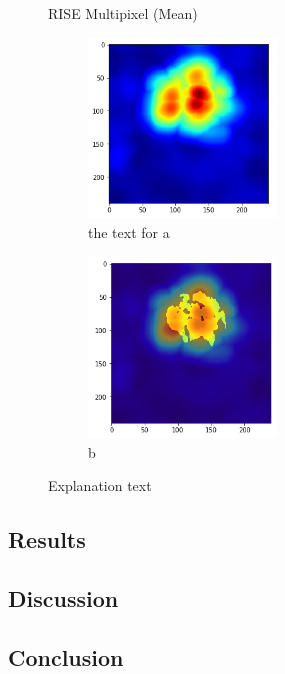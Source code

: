\begin{figure}[H]
    \centering
    \caption{RISE Multipixel (Mean)}
    \begin{subfigure}{.5\textwidth}
        \centering
        \includegraphics[width=5cm]{chapters/04_segmentation/images/rise_multipixel_max_1-0.png}
        \caption{ the text for a}
    \end{subfigure}%
    \begin{subfigure}{.5\textwidth}
        \centering
        \includegraphics[width=5cm]{chapters/04_segmentation/images/rise_multipixel_max_1-1.png}
        \caption{b}
    \end{subfigure}
    \caption{Explanation text}
\end{figure}

\subsection{Results}

\subsection{Discussion}

\subsection{Conclusion}
